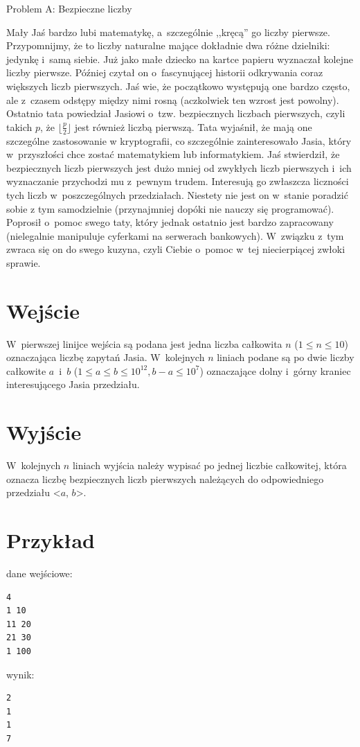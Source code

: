 \documentclass{article}
\begin{document}
\begin{center}
  \begin{Huge}
    Problem A: Bezpieczne liczby
  \end{Huge}
\end{center}

Mały Jaś bardzo lubi matematykę, a~szczególnie ,,kręcą'' go liczby pierwsze. Przypomnijmy, że to
liczby naturalne mające dokładnie dwa różne dzielniki: jedynkę i~samą siebie. Już jako małe
dziecko na kartce papieru wyznaczał kolejne liczby pierwsze. Później czytał on o~fascynującej
historii odkrywania coraz większych liczb pierwszych. Jaś wie, że początkowo występują one
bardzo często, ale z~czasem odstępy między nimi rosną (aczkolwiek ten wzrost jest powolny).
Ostatnio tata powiedział Jasiowi o~tzw. bezpiecznych liczbach pierwszych, czyli takich $p$, że
$\lfloor \frac{p}{2}\rfloor$ jest również liczbą pierwszą. Tata wyjaśnił, że mają one szczególne zastosowanie w
kryptografii, co szczególnie zainteresowało Jasia, który w~przyszłości chce zostać matematykiem
lub informatykiem. Jaś stwierdził, że bezpiecznych liczb pierwszych jest dużo mniej od zwykłych
liczb pierwszych i~ich wyznaczanie przychodzi mu z~pewnym trudem. Interesują go zwłaszcza
liczności tych liczb w~poszczególnych przedziałach. Niestety nie jest on w~stanie poradzić sobie z
tym samodzielnie (przynajmniej dopóki nie nauczy się programować). Poprosił o~pomoc swego
taty, który jednak ostatnio jest bardzo zapracowany (nielegalnie manipuluje cyferkami na serwerach
bankowych). W~związku z~tym zwraca się on do swego kuzyna, czyli Ciebie o~pomoc w~tej
niecierpiącej zwłoki sprawie.

\section*{Wejście}

W~pierwszej linijce wejścia są podana jest jedna liczba całkowita $n$ ($1 \leqslant n \leqslant 10$) oznaczająca liczbę
zapytań Jasia. W~kolejnych $n$ liniach podane są po dwie liczby całkowite $a$~i~$b$ ($1 \leqslant a \leqslant b \leqslant 10^{12} , b-a \leqslant 10^7$)
oznaczające dolny i~górny kraniec interesującego Jasia przedziału.

\section*{Wyjście}
W~kolejnych $n$ liniach wyjścia należy wypisać po jednej liczbie całkowitej, która oznacza liczbę bezpiecznych liczb pierwszych należących do odpowiedniego przedziału <$a$, $b$>.

\section*{Przykład}
dane wejściowe:
\begin{verbatim}
4
1 10
11 20
21 30
1 100
\end{verbatim}
wynik:
\begin{verbatim}
2
1
1
7
\end{verbatim}
\end{document}
